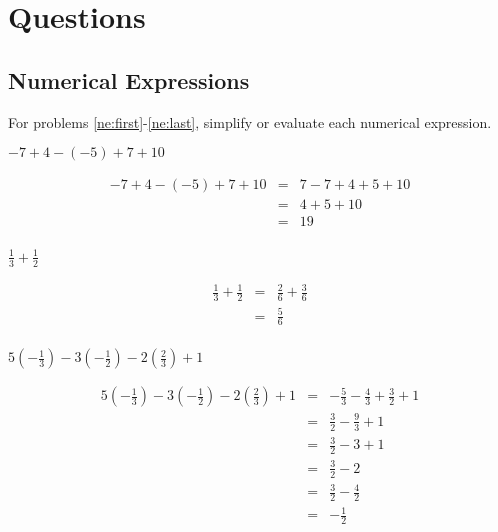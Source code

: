 \documentclass[fleqn,addpoints]{exam}
\begin{document}
\fi

\section{Questions}

\subsection{Numerical Expressions}

For problems \ref{ne:first}-\ref{ne:last}, simplify or evaluate each numerical expression.

\begin{questions}

\question[5]
\label{ne:first}
\( -7 + 4 - (-5) + 7 + 10 \)

\begin{solution}[3 cm]
  \begin{eqnarray*}
    -7 + 4 - (-5) + 7 + 10 & = & 7 - 7 + 4 + 5 + 10 \\
                           & = & 4 + 5 + 10 \\
                           & = & 19 \\
  \end{eqnarray*}
\end{solution}

\question[5]
\( \displaystyle
  \frac{1}{3} + \frac{1}{2} 
\)

\begin{solution}[3 cm]
  \begin{eqnarray*}
    \frac{1}{3} + \frac{1}{2} & = & \frac{2}{6} + \frac{3}{6} \\
                              & = & \frac{5}{6} \\
  \end{eqnarray*}
\end{solution}

\question[5]
\( \displaystyle
  5 (-\frac{1}{3}) - 3(-\frac{1}{2}) - 2(\frac{2}{3}) + 1 
\)
\begin{solution}[3 cm]
  \begin{eqnarray*}
    5 (-\frac{1}{3}) - 3(-\frac{1}{2}) - 2(\frac{2}{3}) + 1 & = & -\frac{5}{3} - \frac{4}{3} + \frac{3}{2} + 1 \\
    & = & \frac{3}{2} - \frac{9}{3} + 1 \\
    & = & \frac{3}{2} - 3 + 1 \\
    & = & \frac{3}{2} - 2 \\
    & = & \frac{3}{2} - \frac{4}{2} \\
    & = & -\frac{1}{2} \\
  \end{eqnarray*}
\end{solution}


\end{questions}
\end{document}
